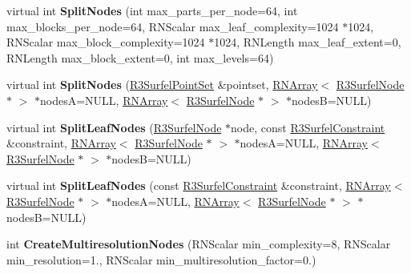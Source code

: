 \begin{DoxyCompactItemize}
\item 
virtual int {\bfseries Split\+Nodes} (int max\+\_\+parts\+\_\+per\+\_\+node=64, int max\+\_\+blocks\+\_\+per\+\_\+node=64, R\+N\+Scalar max\+\_\+leaf\+\_\+complexity=1024 $\ast$1024, R\+N\+Scalar max\+\_\+block\+\_\+complexity=1024 $\ast$1024, R\+N\+Length max\+\_\+leaf\+\_\+extent=0, R\+N\+Length max\+\_\+block\+\_\+extent=0, int max\+\_\+levels=64)\hypertarget{class_r3_surfel_tree_a66ab3a40ccbbaa0651cdb1e062ed160a}{}\label{class_r3_surfel_tree_a66ab3a40ccbbaa0651cdb1e062ed160a}

\item 
virtual int {\bfseries Split\+Nodes} (\hyperlink{class_r3_surfel_point_set}{R3\+Surfel\+Point\+Set} \&pointset, \hyperlink{class_r_n_array}{R\+N\+Array}$<$ \hyperlink{class_r3_surfel_node}{R3\+Surfel\+Node} $\ast$ $>$ $\ast$nodesA=N\+U\+LL, \hyperlink{class_r_n_array}{R\+N\+Array}$<$ \hyperlink{class_r3_surfel_node}{R3\+Surfel\+Node} $\ast$ $>$ $\ast$nodesB=N\+U\+LL)\hypertarget{class_r3_surfel_tree_abaff7ce6d22daba6872acde1d7ba8629}{}\label{class_r3_surfel_tree_abaff7ce6d22daba6872acde1d7ba8629}

\item 
virtual int {\bfseries Split\+Leaf\+Nodes} (\hyperlink{class_r3_surfel_node}{R3\+Surfel\+Node} $\ast$node, const \hyperlink{class_r3_surfel_constraint}{R3\+Surfel\+Constraint} \&constraint, \hyperlink{class_r_n_array}{R\+N\+Array}$<$ \hyperlink{class_r3_surfel_node}{R3\+Surfel\+Node} $\ast$ $>$ $\ast$nodesA=N\+U\+LL, \hyperlink{class_r_n_array}{R\+N\+Array}$<$ \hyperlink{class_r3_surfel_node}{R3\+Surfel\+Node} $\ast$ $>$ $\ast$nodesB=N\+U\+LL)\hypertarget{class_r3_surfel_tree_a2c9ddd55c0493d96c1cfad1edfd37cb3}{}\label{class_r3_surfel_tree_a2c9ddd55c0493d96c1cfad1edfd37cb3}

\item 
virtual int {\bfseries Split\+Leaf\+Nodes} (const \hyperlink{class_r3_surfel_constraint}{R3\+Surfel\+Constraint} \&constraint, \hyperlink{class_r_n_array}{R\+N\+Array}$<$ \hyperlink{class_r3_surfel_node}{R3\+Surfel\+Node} $\ast$ $>$ $\ast$nodesA=N\+U\+LL, \hyperlink{class_r_n_array}{R\+N\+Array}$<$ \hyperlink{class_r3_surfel_node}{R3\+Surfel\+Node} $\ast$ $>$ $\ast$nodesB=N\+U\+LL)\hypertarget{class_r3_surfel_tree_a1935349f9ae274fc8654b292323e3a74}{}\label{class_r3_surfel_tree_a1935349f9ae274fc8654b292323e3a74}

\item 
int {\bfseries Create\+Multiresolution\+Nodes} (R\+N\+Scalar min\+\_\+complexity=8, R\+N\+Scalar min\+\_\+resolution=1., R\+N\+Scalar min\+\_\+multiresolution\+\_\+factor=0.)\hypertarget{class_r3_surfel_tree_a21f1a3d9145c737ee134c90a95e51a3b}{}\label{class_r3_surfel_tree_a21f1a3d9145c737ee134c90a95e51a3b}


\end{DoxyCompactItemize}
